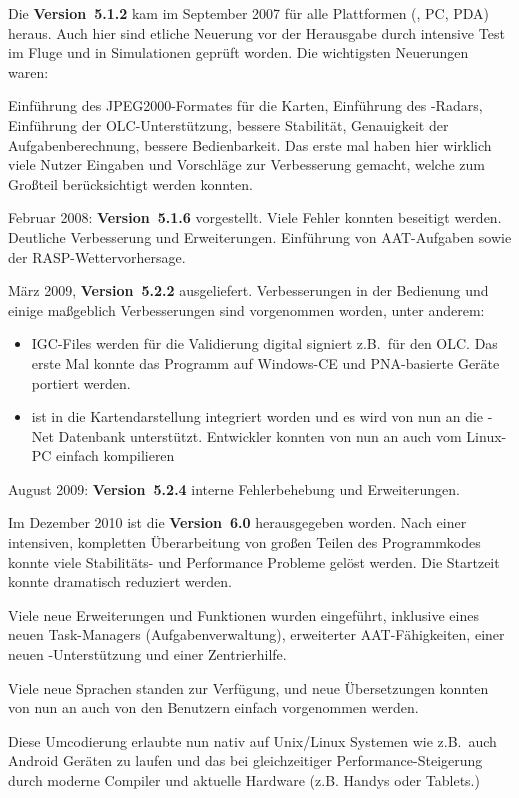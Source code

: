 Die {\bf Version~5.1.2} kam im September 2007 für alle Plattformen (\xc, PC, PDA) heraus.
Auch hier sind etliche Neuerung vor der Herausgabe  durch intensive Test im Fluge und in Simulationen geprüft worden.
Die wichtigsten Neuerungen waren:

Einführung des JPEG2000-Formates für die Karten, Einführung des \fl-Radars, Einführung der
OLC-Unterstützung, bessere Stabilität, Genauigkeit der Aufgabenberechnung, bessere Bedienbarkeit.
Das erste mal haben hier wirklich viele Nutzer Eingaben und Vorschläge zur Verbesserung gemacht,
welche  zum Großteil berücksichtigt werden konnten.

Februar 2008:  {\bf Version~5.1.6} vorgestellt. Viele Fehler konnten beseitigt werden. Deutliche Verbesserung und
Erweiterungen. Einführung von AAT-Aufgaben sowie der RASP-Wettervorhersage.

März 2009, {\bf Version~5.2.2} ausgeliefert. Verbesserungen in der Bedienung und einige maßgeblich Verbesserungen sind
vorgenommen worden, unter anderem:

\begin{itemize}
   \item IGC-Files werden für die Validierung digital signiert z.B.\ für den OLC. Das erste Mal konnte das Programm auf Windows-CE
und PNA-basierte Geräte portiert werden.

\item \fl ist in die Kartendarstellung integriert worden und es wird von nun an die \fl-Net Datenbank unterstützt.
Entwickler konnten von nun an \xc auch vom Linux-PC einfach kompilieren
\end{itemize}
August  2009: {\bf Version~5.2.4} interne Fehlerbehebung und Erweiterungen.

Im Dezember 2010 ist die {\bf Version~6.0} herausgegeben worden.
Nach einer intensiven, kompletten  Überarbeitung von großen Teilen des Programmkodes konnte viele Stabilitäts- und Performance
Probleme gelöst werden. Die Startzeit konnte dramatisch reduziert werden.

Viele neue Erweiterungen und Funktionen wurden eingeführt, inklusive eines neuen Task-Managers (Aufgabenverwaltung),
erweiterter AAT-Fähigkeiten, einer neuen \fl-Unterstützung und einer Zentrierhilfe.

Viele neue Sprachen standen zur Verfügung, und neue Übersetzungen konnten von nun an auch von
den Benutzern einfach vorgenommen werden.

Diese Umcodierung erlaubte \xc nun nativ auf Unix/Linux Systemen wie z.B.\ auch Android Geräten zu laufen
und das bei gleichzeitiger Performance-Steigerung durch moderne Compiler und aktuelle Hardware (z.B. Handys oder Tablets.)

